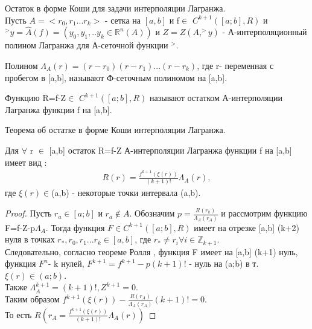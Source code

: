 \documentclass[__main__.tex]{subfiles}
\begin{document}
Остаток в форме Коши для задачи интерполяции Лагранжа.
\\
Пусть $A=<r_{0},r_{1}...r_{k}>$ - сетка на $[a,b]$ и f$\in$ $C^{k+1} ([a;b],R)$ и $^>y=\hat{A}(f)=(y_{0},y_{1},..y_{k}\in \mathbb{R}^{n}(A))$ и $Z=Z(A,^{>}y)$ - А-интерполяционный полином Лагранжа для А-сеточной функции $^{>}$.

\begin{definition}
	Полином $\Lambda_{A}(r)=(r-r_{0})(r-r_{1})...(r-r_{k})$, где r- переменная с пробегом в [a,b], называют Ф-сеточным полиномом на [a,b].
	\end{definition}

Функцию R=f-Z$\in$ $C^{k+1} ([a;b],R)$ называют остатком А-интерполяции Лагранжа функции f на [a,b].

	\begin{theorem}
	Теорема об остатке в форме Коши интерполяции Лагранжа.
	
	Для $\forall$ r $\in$ [a,b] остаток R=f-Z А-интерполяции Лагранжа функции f на [a,b] имеет вид :
	\begin{gather}
		\label{ss1}
		R(r)=\frac{f^{k+1}(\xi(r))}{(k+1)!}\Lambda_{A}(r),
	\end{gather}
где $\xi(r)\in$(a,b) - некоторые точки интервала (a,b).
\end{theorem}

\begin{proof}
	Пусть  $r_{a}\in [a;b]$ и $r_{a}\notin A.$ Обозначим $p=\frac{R(r_{k})}{\Lambda_{A}(r_{A})}$ и рассмотрим функцию F=f-Z-p$\Lambda_{A}$. Тогда функция $F\in C^{k+1} ([a;b],R)$ имеет на отрезке [a,b] (k+2) нуля в точках $r_{*}, r_{0},r_{1}...r_{k}\in [a,b]$, где $r_{*}\neq r_{i} \forall i\in \mathbb{Z}_{k+1}.$\\
	 Следовательно, согласно теореме Ролля , функция F имеет на [a,b] (k+1) нуль, функция $F^{n}$- k нулей, $F^{k+1}=f^{k+1}-p(k+1)!$ - нуль на (a;b) в т. $\xi(r)\in(a;b)$. \\
   	Также $\Lambda^{k+1}_{A}=(k+1)!, Z^{k+1}=0$.\\
	 Таким образом  $f^{k+1}(\xi(r))-\frac{R(r_{A})}{\Lambda_{A}(r_{A})}(k+1)!=0.$\\
	  То есть  $R(r_{A}=\frac{f^{k+1}(\xi(r))}{(k+1)!}\Lambda_{A}(r))$
\end{proof}
\end{document}
